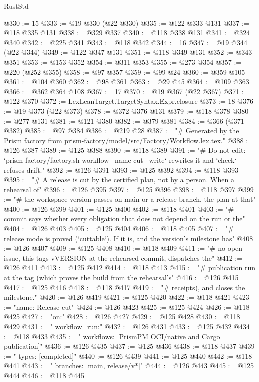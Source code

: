 \begin{lexlean}{RustStd}
\begin{coremodule}
@330 := 15
@333 := @19 @330 (@22 @330)
@335 := @122 @333 @131
@337 := @118 @335 @131
@338 := @329 @337
@340 := @118 @338 @131
@341 := @324 @340
@342 := @225 @341
@343 := @118 @342
@344 := 16
@347 := @19 @344 (@22 @344)
@349 := @122 @347 @131
@351 := @118 @349 @131
@352 := @343 @351
@353 := @153 @352
@354 := @311 @353
@355 := @273 @354
@357 := @220 (@252 @355)
@358 := @97 @357
@359 := @99 @24
@360 := @359 @105
@361 := @104 @360
@362 := @98 @361
@363 := @29 @45
@364 := @109 @363
@366 := @362 @364 @108
@367 := 17
@370 := @19 @367 (@22 @367)
@371 := @122 @370
@372 := LexLeanTarget.TargetSyntax.Expr.closure
@373 := 18
@376 := @19 @373 (@22 @373)
@378 := @372 @376 @131
@379 := @118 @378
@380 := @277 @131
@381 := @121 @380
@382 := @379 @381
@384 := @366 (@371 @382)
@385 := @97 @384
@386 := @219 @28
@387 := "# Generated by the Prism factory from prism-factory/model/src/Factory/Workflow.lex.tex."
@388 := @126 @387
@389 := @125 @388
@390 := @118 @389
@391 := "# Do not edit: `prism-factory/factory.sh workflow --name cut --write` rewrites it and `check` refuses drift."
@392 := @126 @391
@393 := @125 @392
@394 := @118 @393
@395 := "# A release is cut by the certified plan, not by a person. When a rehearsal of"
@396 := @126 @395
@397 := @125 @396
@398 := @118 @397
@399 := "# the workspace version passes on main or a release branch, the plan at that"
@400 := @126 @399
@401 := @125 @400
@402 := @118 @401
@403 := "# commit says whether every obligation that does not depend on the run or the"
@404 := @126 @403
@405 := @125 @404
@406 := @118 @405
@407 := "# release mode is proved (`cuttable`). If it is, and the version's milestone has"
@408 := @126 @407
@409 := @125 @408
@410 := @118 @409
@411 := "# no open issue, this tags vVERSION at the rehearsed commit, dispatches the"
@412 := @126 @411
@413 := @125 @412
@414 := @118 @413
@415 := "# publication run at the tag (which proves the build from the rehearsal's"
@416 := @126 @415
@417 := @125 @416
@418 := @118 @417
@419 := "# receipts), and closes the milestone."
@420 := @126 @419
@421 := @125 @420
@422 := @118 @421
@423 := "name: Release cut"
@424 := @126 @423
@425 := @125 @424
@426 := @118 @425
@427 := "on:"
@428 := @126 @427
@429 := @125 @428
@430 := @118 @429
@431 := "  workflow_run:"
@432 := @126 @431
@433 := @125 @432
@434 := @118 @433
@435 := "    workflows: [PrismPM OCI/native and Cargo publication]"
@436 := @126 @435
@437 := @125 @436
@438 := @118 @437
@439 := "    types: [completed]"
@440 := @126 @439
@441 := @125 @440
@442 := @118 @441
@443 := "    branches: [main, release/v*]"
@444 := @126 @443
@445 := @125 @444
@446 := @118 @445

\end{coremodule}
\end{lexlean}
